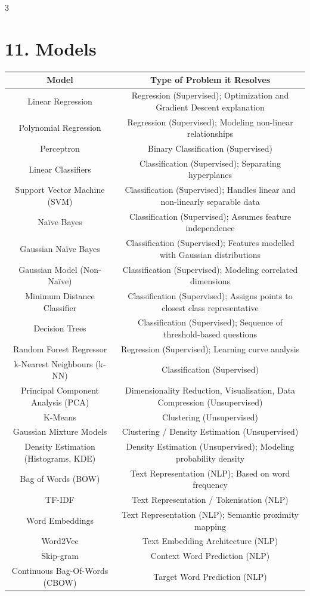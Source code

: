 \documentclass[10pt, a4paper, landscape]{article}
\begin{document}
\begin{multicols*}{3}
\newpage
\section{11. Models}
\begin{tabular}{|c|c|}
\hline
\textbf{Model} & \textbf{Type of Problem it Resolves} \\ \hline
Linear Regression & Regression (Supervised); Optimization and Gradient Descent explanation \\ \hline
Polynomial Regression & Regression (Supervised); Modeling non-linear relationships \\ \hline
Perceptron & Binary Classification (Supervised) \\ \hline
Linear Classifiers & Classification (Supervised); Separating hyperplanes \\ \hline
Support Vector Machine (SVM) & Classification (Supervised); Handles linear and non-linearly separable data \\ \hline
Na\"ive Bayes & Classification (Supervised); Assumes feature independence \\ \hline
Gaussian Na\"ive Bayes & Classification (Supervised); Features modelled with Gaussian distributions \\ \hline
Gaussian Model (Non-Na\"ive) & Classification (Supervised); Modeling correlated dimensions \\ \hline
Minimum Distance Classifier & Classification (Supervised); Assigns points to closest class representative \\ \hline
Decision Trees & Classification (Supervised); Sequence of threshold-based questions \\ \hline
Random Forest Regressor & Regression (Supervised); Learning curve analysis \\ \hline
k-Nearest Neighbours (k-NN) & Classification (Supervised) \\ \hline
Principal Component Analysis (PCA) & Dimensionality Reduction, Visualisation, Data Compression (Unsupervised) \\ \hline
K-Means & Clustering (Unsupervised) \\ \hline
Gaussian Mixture Models & Clustering / Density Estimation (Unsupervised) \\ \hline
Density Estimation (Histograms, KDE) & Density Estimation (Unsupervised); Modeling probability density \\ \hline
Bag of Words (BOW) & Text Representation (NLP); Based on word frequency \\ \hline
TF-IDF & Text Representation / Tokenisation (NLP) \\ \hline
Word Embeddings & Text Representation (NLP); Semantic proximity mapping \\ \hline
Word2Vec & Text Embedding Architecture (NLP) \\ \hline
Skip-gram & Context Word Prediction (NLP) \\ \hline
Continuous Bag-Of-Words (CBOW) & Target Word Prediction (NLP) \\ \hline
\end{tabular}


\end{multicols*}
\end{document}
